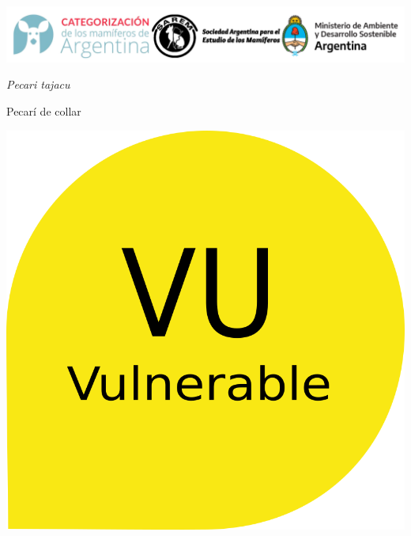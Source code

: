 \documentclass[
  x11names]{article}
\author{}
\date{\vspace{-2.5em}Fecha de creación: 03 April, 2023}
\begin{document}
\setmainfont{Arial}
\setsansfont{Arial}
\setmonofont{Arial}

\newcommand\invisiblesection[1]{%
  \refstepcounter{section}%
  \addcontentsline{toc}{section}{\protect\numberline{\thesection}#1}%
  \sectionmark{#1}}


%
\vspace{-0.4cm}

\includegraphics[width=1\linewidth]{images/Base_info/logo}

\vspace{1cm}

\begin{minipage}{0.7\textwidth}
\vspace{0.3cm}
\fontsize{20}{24}\selectfont\textit{Pecari tajacu}

\vspace{0.3cm}
\fontsize{30}{36}\selectfont Pecarí de collar
\end{minipage}
\hspace{0.05\textwidth}
\begin{minipage}{0.25\textwidth}
\includegraphics[width=\textwidth]{images/vu.png}
\end{minipage}
\end{document}
